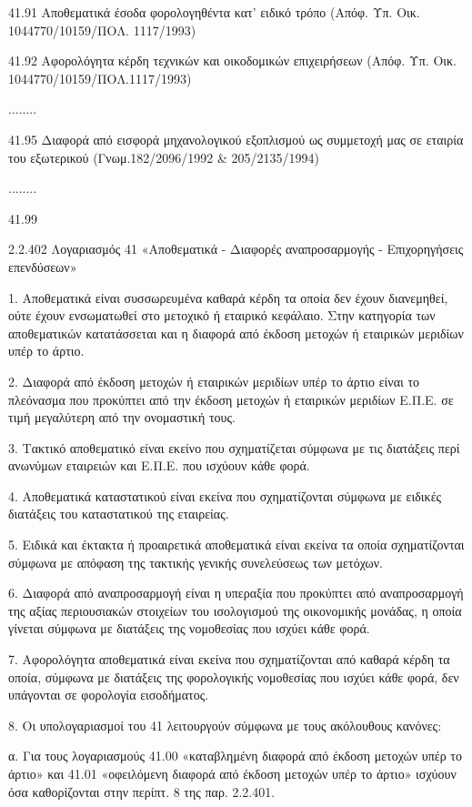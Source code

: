 \documentclass[A4,10pt,greek]{book}
\begin{document}
        41.91   Αποθεματικά έσοδα φορολογηθέντα κατ' ειδικό τρόπο
                    (Απόφ. Υπ. Οικ. 1044770/10159/ΠΟΛ. 1117/1993)

        41.92   Αφορολόγητα κέρδη τεχνικών και οικοδομικών επιχειρήσεων
                    (Απόφ. Υπ. Οικ. 1044770/10159/ΠΟΛ.1117/1993)

        ........

        41.95   Διαφορά από εισφορά μηχανολογικού εξοπλισμού ως συμμετοχή μας
                    σε εταιρία του εξωτερικού (Γνωμ.182/2096/1992 \& 205/2135/1994) 

        ........

        41.99

2.2.402 Λογαριασμός 41 «Αποθεματικά - Διαφορές αναπροσαρμογής - Επιχορηγήσεις επενδύσεων»

1. Αποθεματικά είναι συσσωρευμένα καθαρά κέρδη τα οποία δεν έχουν διανεμηθεί, ούτε έχουν ενσωματωθεί στο μετοχικό ή εταιρικό κεφάλαιο. Στην κατηγορία των αποθεματικών κατατάσσεται και η διαφορά από έκδοση μετοχών ή εταιρικών μεριδίων υπέρ το άρτιο.

2. Διαφορά από έκδοση μετοχών ή εταιρικών μεριδίων υπέρ το άρτιο είναι το πλεόνασμα που προκύπτει από την έκδοση μετοχών ή εταιρικών μεριδίων Ε.Π.Ε. σε τιμή μεγαλύτερη από την ονομαστική τους.

3. Τακτικό αποθεματικό είναι εκείνο που σχηματίζεται σύμφωνα με τις διατάξεις περί ανωνύμων εταιρειών και Ε.Π.Ε. που ισχύουν κάθε φορά.

4. Αποθεματικά καταστατικού είναι εκείνα που σχηματίζονται σύμφωνα με ειδικές διατάξεις του καταστατικού της εταιρείας.

5. Ειδικά και έκτακτα ή προαιρετικά αποθεματικά είναι εκείνα τα οποία σχηματίζονται σύμφωνα με απόφαση της τακτικής γενικής συνελεύσεως των μετόχων.

6. Διαφορά από αναπροσαρμογή είναι η υπεραξία που προκύπτει από αναπροσαρμογή της αξίας περιουσιακών στοιχείων του ισολογισμού της οικονομικής μονάδας, η οποία γίνεται σύμφωνα με διατάξεις της νομοθεσίας που ισχύει κάθε φορά.

7. Αφορολόγητα αποθεματικά είναι εκείνα που σχηματίζονται από καθαρά κέρδη τα οποία, σύμφωνα με διατάξεις της φορολογικής νομοθεσίας που ισχύει κάθε φορά, δεν υπάγονται σε φορολογία εισοδήματος.

8. Οι υπολογαριασμοί του 41 λειτουργούν σύμφωνα με τους ακόλουθους κανόνες:

α. Για τους λογαριασμούς 41.00 «καταβλημένη διαφορά από έκδοση μετοχών υπέρ το άρτιο» και 41.01 «οφειλόμενη διαφορά από έκδοση μετοχών υπέρ το άρτιο» ισχύουν όσα καθορίζονται στην περίπτ. 8 της παρ. 2.2.401.
\end{document}
